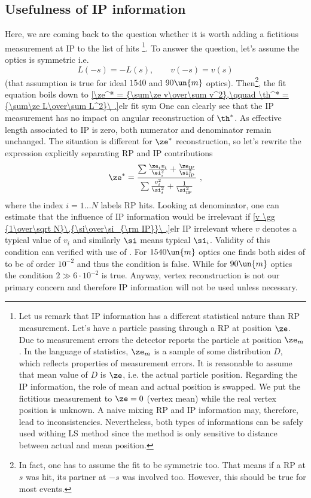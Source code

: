 \break
\subsection[ip]{Usefulness of IP information}

Here, we are coming back to the question whether it is worth adding a fictitious measurement at IP to the list of hits
\footnote{%
Let us remark that IP information has a different statistical nature than RP measurement. Let's have a particle passing through a RP at position $\ze$. Due to measurement errors the detector reports the particle at position $\ze_m$. In the language of statistics, $\ze_m$ is a sample of some distribution $D$, which reflects properties of measurement errors. It is reasonable to assume that mean value of $D$ is $\ze$, i.e. the actual particle position. Regarding the IP information, the role of mean and actual position is swapped. We put the fictitious measurement to $\ze = 0$ (vertex mean) while the real vertex position is unknown. A naive mixing RP and IP information may, therefore, lead to inconsistencies. Nevertheless, both types of informations can be safely used withing LS method since the method is only sensitive to distance between actual and mean position.
}. To answer the question, let's assume the optics is symmetric i.e.
$$L(-s) = - L(s),\qquad v(-s) = v(s)$$
(that assumption is true for ideal $1540$ and $90\un{m}$ optics). Then\footnote{%
In fact, one has to assume the fit to be symmetric too. That means if a RP at $s$ was hit, its partner at $-s$ was involved too. However, this should be true for most events.
}, the fit equation boils down to
\eqref{\ze^* = {\sum\ze v\over\sum v^2},\qquad \th^* = {\sum\ze L\over\sum L^2}\ .}{elr fit sym}
One can clearly see that the IP measurement has no impact on angular reconstruction of $\th^*$. As effective length associated to IP is zero, both numerator and denominator remain unchanged. The situation is different for $\ze^*$ reconstruction, so let's rewrite the expression explicitly separating RP and IP contributions
$$\ze^* = {\sum{\ze_i v_i\over\si_i^2} + {\ze_{\rm IP}\over \si^2_{\rm IP}}\over \sum {v_i^2\over\si_i^2} + {1\over\si_{\rm IP}^2}}\ ,$$
where the index $i = 1\ldots N$ labels RP hits. Looking at denominator, one can estimate that the influence of IP information would be irrelevant if
\eqref{v \gg {1\over\sqrt N}\,{\si\over\si_{\rm IP}}\ ,}{elr IP irrelevant}
where $v$ denotes a typical value of $v_i$ and similarly $\si$ means typical $\si_i$. Validity of this condition can verified with use of . For $1540\un{m}$ optics one finds both sides of  to be of order $10^{-2}$ and thus the condition is false. While for $90\un{m}$ optics the condition $2 \gg 6\cdot10^{-2}$ is true. Anyway, vertex reconstruction is not our primary concern and therefore IP information will not be used unless necessary.


